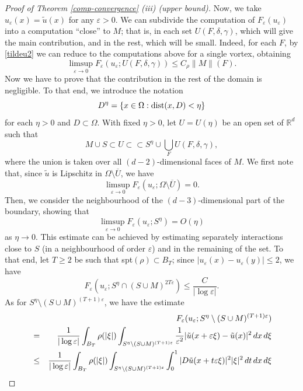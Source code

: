 \documentclass[11pt]{article}
\def\e{\varepsilon}
\begin{document}
\begin{proof}[Proof of Theorem {\rm\ref{comp-convergence}} {\rm (iii)} (upper bound)]
Now, we take $u_\e(x)=\tilde u(x)$ for any $\e>0$. 
We can subdivide the computation of $F_\e(u_\e)$ into a computation ``close'' to $M$; that is, in each set $U(F,\delta,\gamma)$, which will give the main contribution, and in the rest, which will be small. 
Indeed, for each $F$, by \eqref{tildeu2} we can reduce to the computations above for a single vortex, obtaining 
\begin{equation}\label{stimaM} 
\limsup_{\e\to 0}F_\e(u_\e; U(F,\delta,\gamma))\leq C_\rho \|M\|(F). 
\end{equation} 
Now we have to prove that the contribution in the rest of the domain is negligible. 
To that end, we introduce the notation 
$$D^\eta=\{x\in\Omega: {\rm dist}(x,D)<\eta\}$$ 
for each $\eta>0$ and $D\subset\Omega$.  
With fixed $\eta>0$, let $U=U(\eta)$ be an open set of $\mathbb R^d$ such that 
$$M\cup S\subset U\subset\subset S^\eta\cup \bigcup_{F}U(F,\delta,\gamma),$$ 
where the union is taken over all $(d-2)$-dimensional faces of $M$. 
We first note that, since $\tilde u$ is Lipschitz in $\Omega\setminus \overline U$, we have 
\begin{equation}\label{stimafuori} 
\limsup_{\e\to 0}F_\e(u_\e; \Omega\setminus \overline U)=0. 
\end{equation}
Then, we consider the neighbourhood of the $(d-3)$-dimensional part of the boundary, 
showing that 
\begin{equation}\label{stimas} 
\limsup_{\e\to 0}F_\e(u_\e;S^\eta)=O(\eta) 
\end{equation} 
as $\eta\to 0$. This estimate can be achieved by estimating separately interactions close to $S$ (in a neighbourhood of order $\e$) and in the remaining of the set. 
To that end, let $T\geq 2$ be such that spt$(\rho)\subset B_T$; 
since $|u_\e(x)-u_\e(y)|\leq 2$, we have  
\begin{equation}\label{e}
F_\e(u_\e; S^\eta\cap (S\cup M)^{2T\e})\leq \frac{C}{|\log\e|}. 
\end{equation}
As for $S^\eta\setminus (S\cup M)^{(T+1)\e}$, we have the estimate 
\begin{eqnarray*}
&&\hskip-2.5cm F_\e(u_\e; S^\eta\setminus (S\cup M)^{(T+1)\e})\\
&=&
\frac{1}{|\log \e|}\int_{B_T}\rho(|\xi|)\int_{S^\eta\setminus (S\cup M)^{(T+1)\e}} 
\frac{1}{\e^2}|\tilde u(x+\e\xi)-\tilde u(x)|^2 \, dx\, d\xi\\ 
&\leq& 
\frac{1}{|\log \e|}\int_{B_T}\rho(|\xi|)\int_{S^\eta\setminus (S\cup M)^{(T+1)\e}} 
\int_0^1|D\tilde u(x+t\e\xi)|^2 |\xi|^2\, dt\, dx\, d\xi\\

\end{eqnarray*}
\end{proof}
\end{document}
